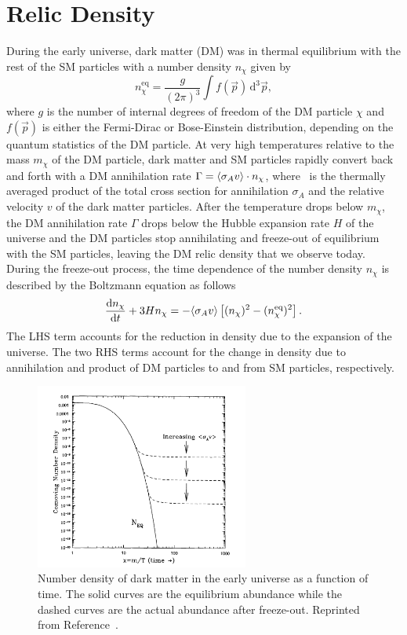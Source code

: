 \section{Relic Density}
\label{sec:dm_relic}

During the early universe, dark matter (DM) was in thermal equilibrium with the rest of the SM particles with a number density $n_\chi$ given by
\begin{equation}
  n_\chi^{\text{eq}} = \frac{g}{(2\pi)^3} \int f(\vec p) \, \text{d}^3 \vec p,
\end{equation}
where $g$ is the number of internal degrees of freedom of the DM particle $\chi$ and $f(\vec p)$ is either the Fermi-Dirac or Bose-Einstein distribution, depending on the quantum statistics of the DM particle.
At very high temperatures relative to the mass $m_\chi$ of the DM particle, dark matter and SM particles rapidly convert back and forth with a DM annihilation rate $\Gamma = \langle \sigma_A v \rangle \cdot n_\chi$, where \sigmav\ is the thermally averaged product of the total cross section for annihilation $\sigma_A$ and the relative velocity $v$ of the dark matter particles.
After the temperature drops below $m_\chi$, the DM annihilation rate $\Gamma$ drops below the Hubble expansion rate $H$ of the universe and the DM particles stop annihilating and freeze-out of equilibrium with the SM particles, leaving the DM relic density that we observe today.
During the freeze-out process, the time dependence of the number density $n_\chi$ is described by the Boltzmann equation as follows
\begin{equation}
  \frac{\text{d} n_\chi}{\text{d}t} + 3 H n_\chi = - \langle \sigma_A v \rangle \left[ (n_\chi)^2 - (n_\chi^{\text{eq}})^2\right].
\end{equation}
The LHS term accounts for the reduction in density due to the expansion of the universe.
The two RHS terms account for the change in density due to annihilation and product of DM particles to and from SM particles, respectively.

\begin{figure}[htbp]
  \centering
  \includegraphics[width=0.625\textwidth]{DarkMatter/Figures/relic_density.png}
  \caption{
    Number density of dark matter in the early universe as a function of time.
    The solid curves are the equilibrium abundance while the dashed curves are the actual abundance after freeze-out.
    Reprinted from Reference~\cite{}. %
  }
  \label{fig:relic_density}
\end{figure}

